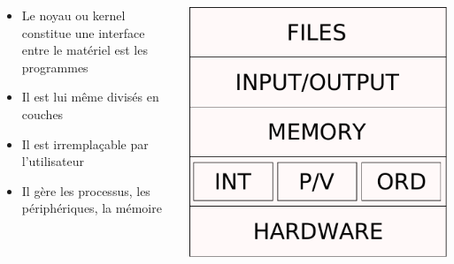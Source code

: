 \begin{frame}{\sectitle}

\begin{columns}[b]

\begin{block}{\subsectitle}
\begin{itemize}
\item Le noyau ou kernel constitue une interface entre le matériel est les programmes
\item Il est lui même divisés en couches 
\item Il est irremplaçable par l'utilisateur
\item Il gère les processus, les périphériques, la mémoire
\end{itemize}
\end{block}

\begin{center}
\includegraphics[width=\textwidth]{images/NoyauCouches.pdf}
\end{center}

\end{columns}
\end{frame}

